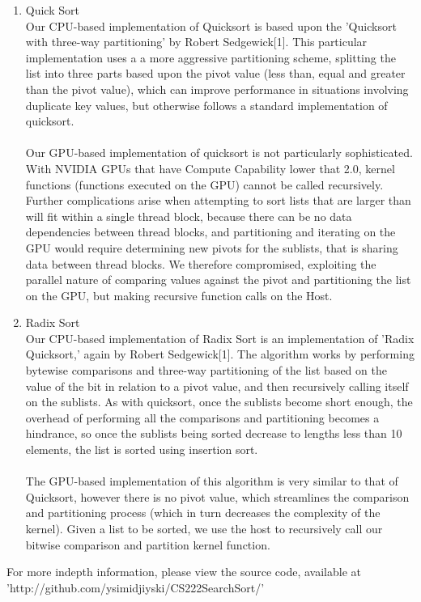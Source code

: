 \documentclass{article}
\begin{document}
\begin{enumerate}
\item Quick Sort\\
        Our CPU-based implementation of Quicksort is based upon the 'Quicksort with three-way partitioning' by Robert Sedgewick[1]. This particular implementation uses a a more aggressive partitioning scheme, splitting the list into three parts based upon the pivot value (less than, equal and greater than the pivot value), which can improve performance in situations involving duplicate key values, but otherwise follows a standard implementation of quicksort.\\
\\
        Our GPU-based implementation of quicksort is not particularly sophisticated. With NVIDIA GPUs that have Compute Capability lower that 2.0, kernel functions (functions executed on the GPU) cannot be called recursively. Further complications arise when attempting to sort lists that are larger than will fit within a single thread block, because there can be no data dependencies between thread blocks, and partitioning and iterating on the GPU would require determining new pivots for the sublists, that is sharing data between thread blocks. We therefore compromised, exploiting the parallel nature of comparing values against the pivot and partitioning the list on the GPU, but making recursive function calls on the Host.\\
  \item Radix Sort\\
        Our CPU-based implementation of Radix Sort is an implementation of 'Radix Quicksort,' again by Robert Sedgewick[1]. The algorithm works by performing bytewise comparisons and three-way partitioning of the list based on the value of the bit in relation to a pivot value, and then recursively calling itself on the sublists. As with quicksort, once the sublists become short enough, the overhead of performing all the comparisons and partitioning becomes a hindrance, so once the sublists being sorted decrease to lengths less than 10 elements, the list is sorted using insertion sort.\\
\\
        The GPU-based implementation of this algorithm is very similar to that of Quicksort, however there is no pivot value, which streamlines the comparison and partitioning process (which in turn decreases the complexity of the kernel). Given a list to be sorted, we use the host to recursively call our bitwise comparison and partition kernel function.

\end{enumerate}
For more indepth information, please view the source code, available at\\ 'http://github.com/ysimidjiyski/CS222SearchSort/'
\end{document}
